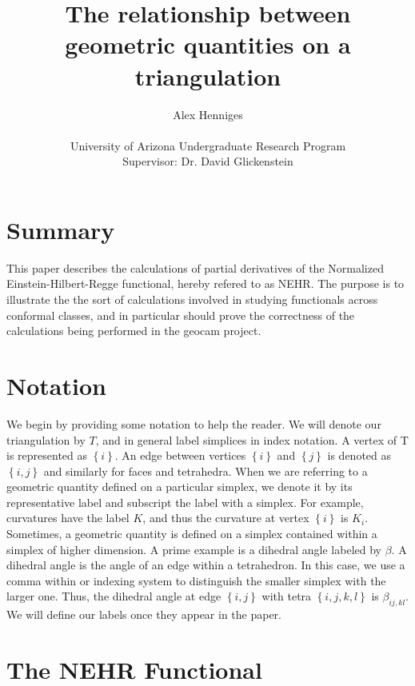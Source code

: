 \documentclass[12pt]{article}
\begin{document}
\title{The relationship between geometric quantities on a triangulation}
\author{Alex Henniges \\
\\
University of Arizona Undergraduate Research Program\\
Supervisor: Dr. David Glickenstein\\
}

\section{Summary}

This paper describes the calculations of partial derivatives of the
Normalized Einstein-Hilbert-Regge functional, hereby refered to as NEHR. The
purpose is to illustrate the the sort of calculations involved in studying
functionals across conformal classes, and in particular should prove the
correctness of the calculations being performed in the geocam project. 
\newline

\section{Notation}

We begin by providing some notation to help the reader. We will denote our
triangulation by $T$, and in general label simplices in index notation. A
vertex of T is represented as $\left\{ {i}\right\} $. An edge between
vertices $\left\{ {i}\right\} $ and $\left\{ {j}\right\} $ is denoted as $%
\left\{ {i,j}\right\} $ and similarly for faces and tetrahedra. When we are
referring to a geometric quantity defined on a particular simplex, we denote
it by its representative label and subscript the label with a simplex. For
example, curvatures have the label $K$, and thus the curvature at vertex $%
\left\{ {i}\right\} $ is $K_{i}$. Sometimes, a geometric quantity is defined
on a simplex contained within a simplex of higher dimension. A prime example
is a dihedral angle labeled by $\beta $. A dihedral angle is the angle of an
edge within a tetrahedron. In this case, we use a comma within or indexing
system to distinguish the smaller simplex with the larger one. Thus, the
dihedral angle at edge $\left\{ {i,j}\right\} $ with tetra $\left\{ {i,j,k,l}%
\right\} $ is $\beta _{ij,kl}$. We will define our labels once they appear
in the paper. \newline

\section{The NEHR Functional}
\end{document}
